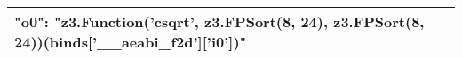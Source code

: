 \begin{tabular}{|l|p{11cm}|}
"o0": "z3.Function('csqrt', z3.FPSort(8, 24), z3.FPSort(8, 24))(binds['\_\_aeabi\_f2d']['i0'])"
 \\ \hline
% 
% 
% 
% 
\end{tabular}
